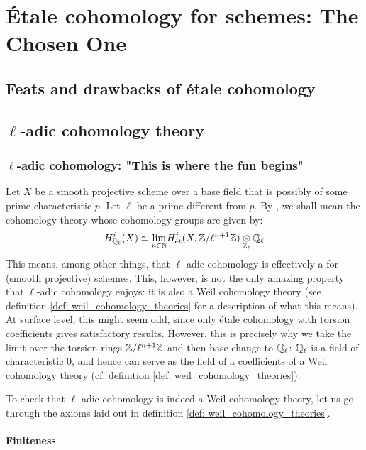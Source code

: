    \section{\'Etale cohomology for schemes: The Chosen One} 
        \subsection{Feats and drawbacks of \'etale cohomology}
        
        \subsection{\texorpdfstring{$\ell$}{}-adic cohomology theory}
            \subsubsection{\texorpdfstring{$\ell$}{}-adic cohomology: "This is where the fun begins"}
                Let $X$ be a smooth projective scheme over a base field that is possibly of some prime characteristic $p$. Let $\ell$ be a prime different from $p$. By , we shall mean the cohomology theory whose cohomology groups are given by:
                    $$H^i_{\Q_{\ell}}(X) \cong \underset{n \in \N}{\lim} H_{\et}^i(X, \Z/\ell^{n + 1}\Z) \tensor_{\Z_{\ell}} \Q_{\ell}$$
                This means, among other things, that $\ell$-adic cohomology is effectively a  for (smooth projective) schemes. This, however, is not the only amazing property that $\ell$-adic cohomology enjoys: it is also a Weil cohomology theory (see definition \ref{def: weil_cohomology_theories} for a description of what this means). At surface level, this might seem odd, since only \'etale cohomology with torsion coefficients gives satisfactory results. However, this is precisely why we take the limit over the torsion rings $\mathbb{Z}/\ell^{n + 1}\mathbb{Z}$ and then base change to $\mathbb{Q}_{\ell}$: $\mathbb{Q}_{\ell}$ is a field of characteristic $0$, and hence can serve as the field of a coefficients of a Weil cohomology theory (cf. definition \ref{def: weil_cohomology_theories}). 
                
                To check that $\ell$-adic cohomology is indeed a Weil cohomology theory, let us  go through the axioms laid out in definition \ref{def: weil_cohomology_theories}.
            
                \paragraph{Finiteness}
            
